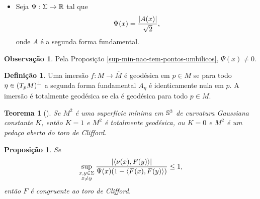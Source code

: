 \documentclass[12pt,a4paper]{beamer}
\newtheorem{teorema}{Teorema}
\newtheorem{proposicao}{Proposição}
\theoremstyle{definition}
\newtheorem{definicao}{Definição}
\newtheorem{observacao}{Observação}
\begin{document}
\begin{frame}

	\begin{itemize}
		\item Seja $\Psi: \Sigma \rightarrow \mathbb R$ tal que
		\begin{equation*}
		\Psi(x) = \frac{\left| A(x) \right|}{\sqrt{2}},
		\end{equation*}
		onde $A$ é a segunda forma fundamental.
	\end{itemize}
	
	\pause
	
	\begin{observacao}
		Pela Proposição \ref{sup-min-nao-tem-pontos-umbilicos}, $\Psi(x) \neq 0$.
	\end{observacao}

	\pause

	\begin{definicao}
		Uma imersão $f: M \rightarrow \overline{M}$ é \alert{geodésica} em $p \in M$ se para todo $\eta \in \left( T_p M \right)^\perp$ a segunda forma fundamental $A_\eta$ é identicamente nula em $p$. A imersão é \alert{totalmente geodésica} se ela é geodésica para todo $p \in M$.
	\end{definicao}

\end{frame}

\begin{frame}

	\begin{teorema}[\cite{Lawson1969}]
		\label{curv-gauss-de-sup-min-em-S3}
		Se $M^2$ é uma superfície mínima em $\mathbb{S}^3$ de curvatura Gaussiana constante $K$, então $K=1$ e $M^2$ é totalmente geodésica, ou $K=0$ e $M^2$ é um pedaço aberto do toro de Clifford.
	\end{teorema}

	\pause

	\begin{proposicao}\label{aleph-leq-1}
		Se
		\begin{equation*}
		\sup_{\substack{x,y \in \Sigma \\ x \neq y}} \frac{\left| \left\langle \nu(x),F(y) \right\rangle \right|}{\Psi(x) (1-\left\langle F(x),F(y) \right\rangle)} \leq 1,
		\end{equation*}
		então $F$ é congruente ao toro de Clifford.
	\end{proposicao}

\end{frame}
\end{document}
